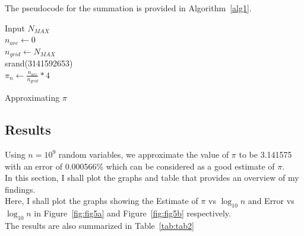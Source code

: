\documentclass[titlepage, 11pt]{article}
\begin{document}
The pseudocode for the summation is provided in Algorithm~\ref{alg1}.
\begin{center}
\begin{algorithm}[H]\label{alg1}

\SetAlgoLined

Input $N_{MAX}$ \\
$n_{arc} \gets 0$ \\
$n_{grid} \gets N_{MAX}$ \\
srand(3141592653)  {\\
  ${\pi}_{n} \gets \frac{n_{arc}}{n_{grid}}*4$
}
\caption{Approximating $\pi$ }
\end{algorithm}    
\end{center}

\subsection{Results}
Using $n=10^9$ random variables, we approximate the value of $\pi$ to be 3.141575 with an error of 0.000566\% which can be considered as a good estimate of $\pi$.\\
In this section, I shall plot the graphs and table that provides an overview of my findings. \\
Here, I shall plot the graphs showing the Estimate of $\pi$ vs $\log_{10}{n}$ and Error vs $\log_{10}{n}$ in Figure~\ref{fig:fig5a} and Figure~\ref{fig:fig5b} respectively. \\
The results are also summarized in Table~\ref{tab:tab2}
\end{document}
